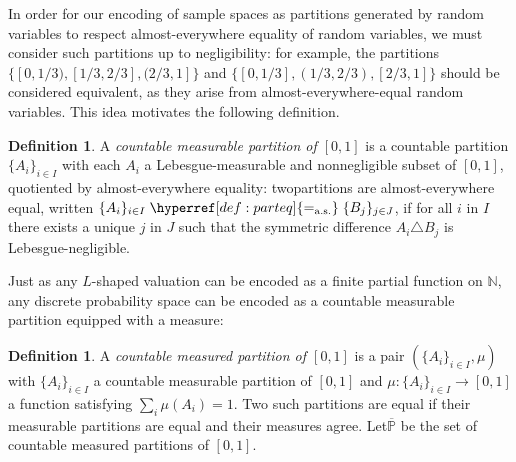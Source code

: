 \documentclass[
  sigconf,
  screen, ]{acmart}
\makeatletter
\theoremstyle{definition}
\newtheorem{definition}[theorem]{Definition}
\newcommand\N{\mathbb N}
\newcommand{\labelword}[2]{\phantomsection
  #1\def\@currentlabel{\unexpanded{#1}}\label{#2}}
\newcommand\nref[2]{\hyperref[#1]{#2}} \newcommand\checkhigh{{\huge{\color{red}\textbf{TODO: check}}}}
\newcommand\aseq{=_{\rm a.s.}}
\newcommand\nomDpspcsprelim{{\nref{def:nomDpspcsprelim}{\overline{\mathbb{P}}}}}
\makeatother
\begin{document}
In order for our encoding
of sample spaces as partitions generated by random variables
to respect almost-everywhere equality of random variables,
we must consider such partitions up to negligibility:
for example,
the partitions $\{[0,1/3), [1/3,2/3], (2/3,1]\}$
and $\{[0,1/3], (1/3,2/3), [2/3,1]\}$
should be considered equivalent,
as they arise from almost-everywhere-equal random variables.
This idea motivates the following definition.

\newcommand\parteq{\mathrel{\nref{def:parteq}{\aseq}}}
\begin{definition}
  A \emph{countable measurable partition of $[0,1]$}
  is a countable partition $\{A_i\}_{i\in I}$
  with each $A_i$ a Lebesgue-measurable and nonnegligible subset of $[0,1]$,
  quotiented by almost-everywhere equality:
  \labelword{two}{def:parteq} partitions are almost-everywhere equal,
  written $\{A_i\}_{i\in I} \parteq \{B_j\}_{j\in J}$,
  if for all $i$ in $I$ there exists a unique $j$ in $J$
  such that the symmetric difference $A_i\triangle B_j$ is Lebesgue-negligible.
\end{definition}

Just as any $L$-shaped valuation can be encoded as a finite partial function on $\N$,
any discrete probability space can be encoded as a countable measurable partition equipped with a measure:

\begin{definition}
  A \emph{countable measured partition of $[0,1]$}
  is a pair $(\{A_i\}_{i\in I}, \mu)$
  with $\{A_i\}_{i\in I}$ a countable measurable partition of $[0,1]$
  and $\mu : \{A_i\}_{i\in I}\to [0,1]$
  a function satisfying $\sum_i \mu(A_i) = 1$.
  Two such partitions
  are equal if their measurable partitions are equal
  and their measures agree.
  \labelword{Let}{def:nomDpspcsprelim} $\nomDpspcsprelim$ be the set of countable measured partitions of $[0,1]$.
\end{definition}
\end{document}
